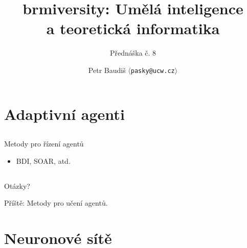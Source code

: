 \documentclass{beamer}
\begin{document}

\title{brmiversity: Umělá inteligence \\ a teoretická informatika}
\subtitle{Přednáška č. 8}
\author{Petr Baudiš $\langle${\tt pasky@ucw.cz}$\rangle$}
\date{}
\frame{\titlepage}

\section{Adaptivní agenti}

\subsection{}
\begin{frame}{Metody pro řízení agentů}
\begin{itemize}
\item BDI, SOAR, atd.
\end{itemize}
\end{frame}

\subsection{}
\begin{frame}{Otázky?}
\begin{center}
Příště: Metody pro učení agentů.
\end{center}
\end{frame}

\section{Neuronové sítě}
\end{document}
